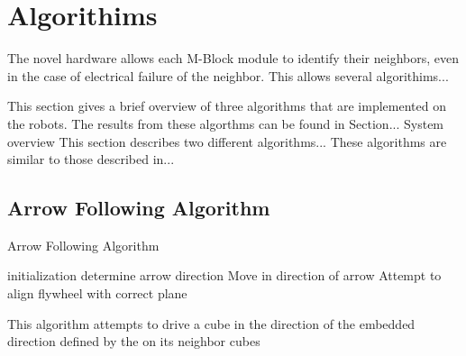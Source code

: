 \section{Algorithims}
\label{sec:Algorithims}

The novel hardware allows each M-Block module to identify their neighbors, even in the case of electrical failure of the
neighbor. This allows several algorithims...


This section gives a brief overview of three algorithms that are implemented on the robots. The results from these algorthms can be found in Section...
System overview
This section describes two different algorithms... These algorithms are similar to those described in...

\subsection{Arrow Following Algorithm}
\label{sec:algArrow}

%
	
\begin{algorithm}[ht] 
	\caption{Arrow Following Algorithm}
	\label{algorithmArrow}
	\SetAlgoLined
	initialization\;
	{
		determine arrow direction\;
		{
			Move in direction of arrow\;
		}
		{
			 Attempt to align flywheel with correct plane\;
		}
	}
	\caption{This algorithm attempts to drive a cube in the direction of the embedded direction defined by the \tagName on its neighbor cubes}

\end{algorithm}


